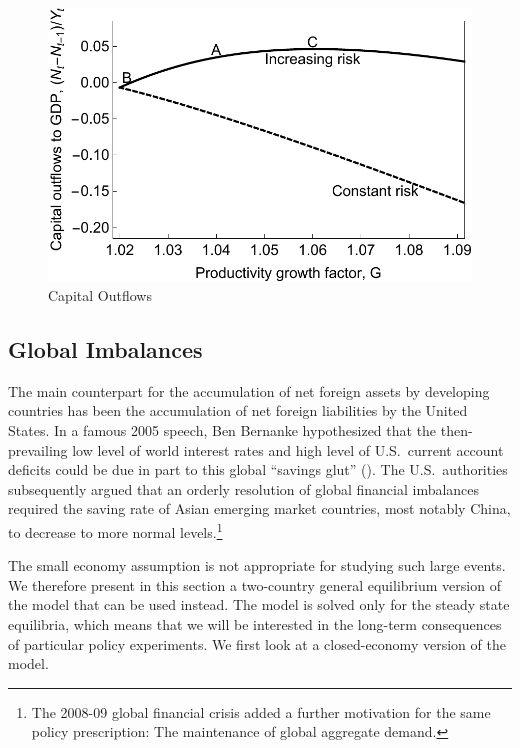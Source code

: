 \documentclass[titlepage]{\econtex}\newcommand{\texname}{cjSOE}
\begin{document}
\medskip

\begin{figure}
\includegraphics{./Figures/capOutflows}
\caption{Capital Outflows}\label{fig:capOutflows}
\end{figure}

\medskip


\subsection{Global Imbalances}

The main counterpart for the accumulation of net foreign assets by
developing countries has been the accumulation of net foreign
liabilities by the United States. In a famous 2005 speech, Ben
Bernanke hypothesized that the then-prevailing low level of world
interest rates and high level of U.S.\ current account deficits could
be due in part to this global ``savings glut''
(\cite{Bernanke:savingglut}). The U.S.\ authorities subsequently
argued that an orderly resolution of global financial imbalances
required the saving rate of Asian emerging market countries, most
notably China, to decrease to more normal levels.\footnote{The
    2008-09 global financial crisis added a further motivation for the
    same policy prescription: The maintenance of global aggregate
    demand.}

The small economy assumption is not appropriate for studying such
large events.  We therefore present in this section a two-country general
equilibrium version of the model that can be used instead. The model
is solved only for the steady state equilibria, which means that we
will be interested in the long-term consequences of particular policy
experiments. We first look at a closed-economy version of the model.
\end{document}
